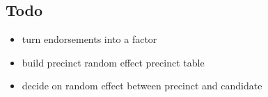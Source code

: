 \documentclass[
]{article}
\providecommand{\tightlist}{%
  \setlength{\itemsep}{0pt}\setlength{\parskip}{0pt}}
\begin{document}
\hypertarget{todo}{%
\subsection{Todo}\label{todo}}

\begin{itemize}
\tightlist
\item
  turn endorsements into a factor
\item
  build precinct random effect precinct table
\item
  decide on random effect between precinct and candidate
\end{itemize}
\end{document}
